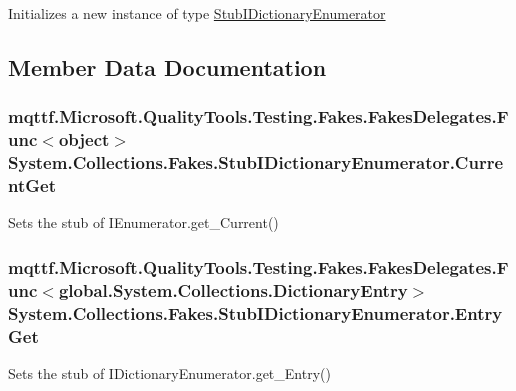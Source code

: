 Initializes a new instance of type \hyperlink{class_system_1_1_collections_1_1_fakes_1_1_stub_i_dictionary_enumerator}{Stub\-I\-Dictionary\-Enumerator}



\subsection{Member Data Documentation}
\hypertarget{class_system_1_1_collections_1_1_fakes_1_1_stub_i_dictionary_enumerator_a0ceb3db7d248ab463deb356bebe78be4}{
\subsubsection[{Current\-Get}]{\setlength{\rightskip}{0pt plus 5cm}mqttf.\-Microsoft.\-Quality\-Tools.\-Testing.\-Fakes.\-Fakes\-Delegates.\-Func$<$object$>$ System.\-Collections.\-Fakes.\-Stub\-I\-Dictionary\-Enumerator.\-Current\-Get}}\label{class_system_1_1_collections_1_1_fakes_1_1_stub_i_dictionary_enumerator_a0ceb3db7d248ab463deb356bebe78be4}


Sets the stub of I\-Enumerator.\-get\-\_\-\-Current()

\hypertarget{class_system_1_1_collections_1_1_fakes_1_1_stub_i_dictionary_enumerator_af5ec64199bf4eefbb2fa56c35224cdfe}{
\subsubsection[{Entry\-Get}]{\setlength{\rightskip}{0pt plus 5cm}mqttf.\-Microsoft.\-Quality\-Tools.\-Testing.\-Fakes.\-Fakes\-Delegates.\-Func$<$global.\-System.\-Collections.\-Dictionary\-Entry$>$ System.\-Collections.\-Fakes.\-Stub\-I\-Dictionary\-Enumerator.\-Entry\-Get}}\label{class_system_1_1_collections_1_1_fakes_1_1_stub_i_dictionary_enumerator_af5ec64199bf4eefbb2fa56c35224cdfe}


Sets the stub of I\-Dictionary\-Enumerator.\-get\-\_\-\-Entry()

